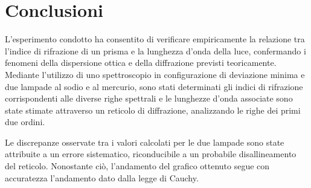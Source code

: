 \documentclass[9pt,a4paper,twocolumn,twoside]{tau-class/tau}
\begin{document}

\section{Conclusioni}
L'esperimento condotto ha consentito di verificare empiricamente la relazione tra l'indice di rifrazione di un prisma e la lunghezza d'onda della luce, confermando i fenomeni della dispersione ottica e della diffrazione previsti teoricamente. Mediante l'utilizzo di uno spettroscopio in configurazione di deviazione minima e due lampade al sodio e al mercurio, sono stati determinati gli indici di rifrazione corrispondenti alle diverse righe spettrali e le lunghezze d'onda associate sono state stimate attraverso un reticolo di diffrazione, analizzando le righe dei primi due ordini.

Le discrepanze osservate tra i valori calcolati per le due lampade sono state attribuite a un errore sistematico, riconducibile a un probabile disallineamento del reticolo. Nonostante ciò, l'andamento del grafico ottenuto segue con accuratezza l'andamento dato dalla legge di Cauchy.




\printbibliography

\end{document}
